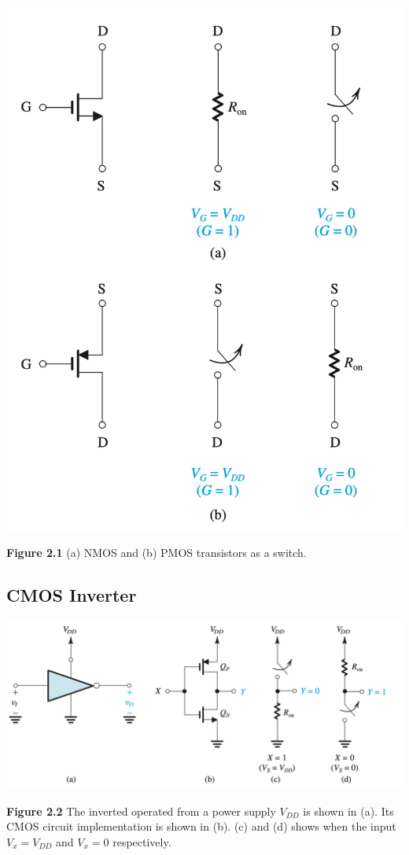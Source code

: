 \documentclass[12pt]{article}
\begin{document}
    \begin{center}
        \includegraphics[scale=0.6]{figures/fig8.png}
    \end{center}
    \textbf{Figure 2.1} (a) NMOS and (b) PMOS transistors as a switch.
    
    \subsection*{CMOS Inverter}

    \begin{center}
        \includegraphics[scale=0.5]{figures/fig9.png}
    \end{center}
    \textbf{Figure 2.2} The inverted operated from a power supply $V_{DD}$ is shown in (a). Its 
    CMOS circuit implementation is shown in (b). (c) and (d) shows when the input $V_x = V_{DD}$ 
    and $V_x = 0$ respectively.
\end{document}
